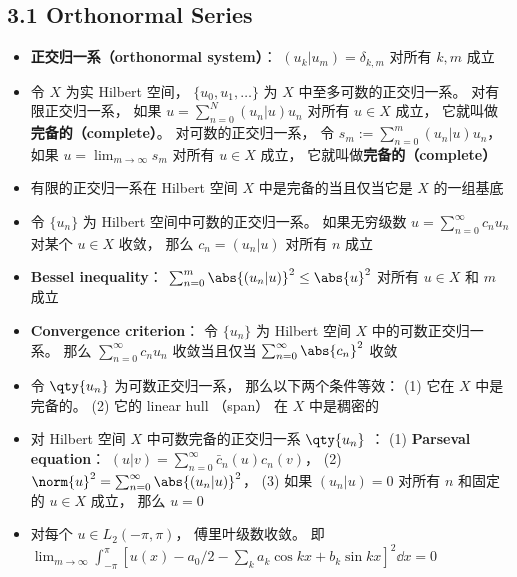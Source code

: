 
\subsection{3.1 Orthonormal Series}
\begin{itemize}
\item \textbf{正交归一系（orthonormal system）}： $(u_k|u_m) = \delta_{k,m}$ 对所有 $k, m$ 成立

\item 令 $X$ 为实 Hilbert 空间， $\{u_0, u_1,\dots\}$ 为 $X$ 中至多可数的正交归一系。 对有限正交归一系， 如果 $u = \sum_{n=0}^N(u_n|u)u_n$ 对所有 $u\in X$ 成立， 它就叫做\textbf{完备的（complete）}。 对可数的正交归一系， 令 $s_m := \sum_{n=0}^m(u_n|u)u_n$， 如果 $u = \lim_{m\to\infty} s_m$ 对所有 $u\in X$ 成立， 它就叫做\textbf{完备的（complete）}

\item 有限的正交归一系在 Hilbert 空间 $X$ 中是完备的当且仅当它是 $X$ 的一组基底

\item 令 $\{u_n\}$ 为 Hilbert 空间中可数的正交归一系。 如果无穷级数 $u = \sum_{n=0}^\infty c_n u_n$ 对某个 $u\in X$ 收敛， 那么 $c_n = (u_n|u)$ 对所有 $n$ 成立

\item \textbf{Bessel inequality}： $\sum_{n=0}^m \abs{(u_n|u)}^2 \le \abs{u}^2$ 对所有 $u \in X$ 和 $m$ 成立

\item \textbf{Convergence criterion}： 令 $\{u_n\}$ 为 Hilbert 空间 $X$ 中的可数正交归一系。 那么 $\sum_{n=0}^\infty c_nu_n$ 收敛当且仅当 $\sum_{n=0}^\infty \abs{c_n}^2$ 收敛

\item 令 $\qty{u_n}$ 为可数正交归一系， 那么以下两个条件等效： (1) 它在 $X$ 中是完备的。 (2) 它的 linear hull （span） 在 $X$ 中是稠密的

\item 对 Hilbert 空间 $X$ 中可数完备的正交归一系 $\qty{u_n}$ ： (1) \textbf{Parseval equation}： $(u|v) = \sum_{n=0}^\infty \bar c_n(u) c_n(v)$， (2) $\norm{u}^2 = \sum_{n=0}^\infty \abs{(u_n|u)}^2$， (3) 如果 $(u_n|u) = 0$ 对所有 $n$ 和固定的 $u\in X$ 成立， 那么 $u=0$

\item 对每个 $u\in L_2(-\pi,\pi)$， 傅里叶级数收敛。 即 $\lim_{m\to\infty}\int_{-\pi}^\pi [u(x)-a_0/2-\sum_k a_k\cos kx + b_k \sin kx]^2 \dd{x} = 0$
\end{itemize}

